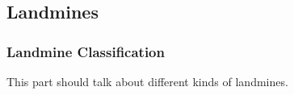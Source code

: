 \subsection{Landmines}

\subsubsection{Landmine Classification}
This part should talk about different kinds of landmines.